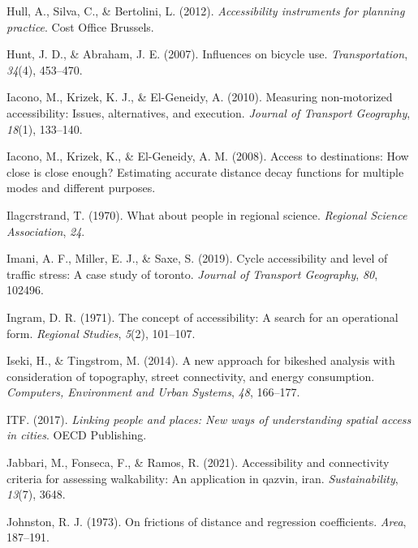 \documentclass[
11pt, %
oneside, %
english, %
singlespacing, %
]{macthesis} %
\newlength{\cslhangindent}
\newenvironment{CSLReferences}[2] %
{\begin{list}{}{%
	\setlength{\itemindent}{0pt}
	\setlength{\leftmargin}{0pt}
	\setlength{\parsep}{0pt}
	\ifodd #1
	\setlength{\leftmargin}{\cslhangindent}
	\setlength{\itemindent}{-1\cslhangindent}
	\fi
	\setlength{\itemsep}{#2\baselineskip}}}
{\end{list}}
\begin{document}
\begin{CSLReferences}{1}{0}
Hull, A., Silva, C., \& Bertolini, L. (2012). \emph{Accessibility instruments for planning practice}. Cost Office Brussels.

Hunt, J. D., \& Abraham, J. E. (2007). Influences on bicycle use. \emph{Transportation}, \emph{34}(4), 453--470.

Iacono, M., Krizek, K. J., \& El-Geneidy, A. (2010). Measuring non-motorized accessibility: Issues, alternatives, and execution. \emph{Journal of Transport Geography}, \emph{18}(1), 133--140.

Iacono, M., Krizek, K., \& El-Geneidy, A. M. (2008). Access to destinations: How close is close enough? Estimating accurate distance decay functions for multiple modes and different purposes.

Ilagcrstrand, T. (1970). What about people in regional science. \emph{Regional Science Association}, \emph{24}.

Imani, A. F., Miller, E. J., \& Saxe, S. (2019). Cycle accessibility and level of traffic stress: A case study of toronto. \emph{Journal of Transport Geography}, \emph{80}, 102496.

Ingram, D. R. (1971). The concept of accessibility: A search for an operational form. \emph{Regional Studies}, \emph{5}(2), 101--107.

Iseki, H., \& Tingstrom, M. (2014). A new approach for bikeshed analysis with consideration of topography, street connectivity, and energy consumption. \emph{Computers, Environment and Urban Systems}, \emph{48}, 166--177.

ITF. (2017). \emph{Linking people and places: New ways of understanding spatial access in cities}. OECD Publishing.

Jabbari, M., Fonseca, F., \& Ramos, R. (2021). Accessibility and connectivity criteria for assessing walkability: An application in qazvin, iran. \emph{Sustainability}, \emph{13}(7), 3648.

Johnston, R. J. (1973). On frictions of distance and regression coefficients. \emph{Area}, 187--191.


\end{CSLReferences}
\end{document}
